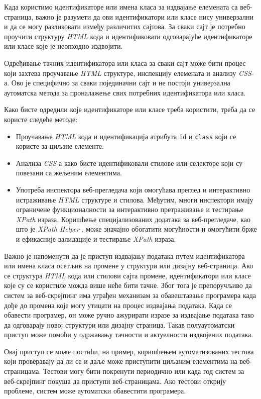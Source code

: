 \documentclass[12pt,oneside]{memoir}
\begin{document}
Када користимо идентификаторе или имена класа за издвајање елемената са веб-страница, важно је разумети да ови идентификатори или класе нису универзални и да се могу разликовати између различитих сајтова. За сваки сајт је потребно проучити структуру \textit{HTML} кода и идентификовати одговарајуће идентификаторе или класе које је неопходно издвојити.

Одређивање тачних идентификатора или класа за сваки сајт може бити процес који захтева проучавање \textit{HTML} структуре, инспекцију елемената и анализу \textit{CSS}-а. Ово је специфично за сваки појединачни сајт и не постоји универзална аутоматска метода за проналажење свих потребних идентификатора или класа.

Како бисте одредили које идентификаторе или класе треба користити, треба да се користе следеће методе:
\begin{itemize}
\item Проучавање \textit{HTML} кода и идентификација атрибута \texttt{id} и \texttt{class}  који се користе за циљане елементе.
\item Анализа \textit{CSS}-а како бисте идентификовали стилове или селекторе који су повезани са жељеним елементима.
\item Употреба инспектора веб-прегледача који омогућава преглед и интерактивно истраживање \textit{HTML} структуре и стилова. Међутим, многи инспектори имају ограничене функционалности за интерактивно претраживање и тестирање \textit{XPath} израза. Коришћење специјализованих додатака за веб-прегледаче, као што је \textit{XPath Helper} \cite{xpathHelper}, може значајно обогатити могућности и омогућити брже и ефикасније валидације и тестирање \textit{XPath} израза.
\end{itemize}

Важно је напоменути да је приступ издвајању података путем идентификатора или имена класа осетљив на промене у структури или дизајну веб-страница. Ако се структура \textit{HTML} кода или стилови сајта промене, идентификатори или класе које су се користиле можда више неће бити тачне. Због тога је препоручљиво да систем за веб-скрејпинг има уграђен механизам за обавештавање програмера када дође до промена које могу утицати на процес издвајања података. Када се обавести програмер, он може ручно ажурирати изразе за издвајање података тако да одговарају новој структури или дизајну страница. Такав полуаутоматски приступ може помоћи у одржавању тачности и актуелности издвојених података.

Овај приступ се може постићи, на пример, коришћењем аутоматизованих тестова који проверавају да ли се и даље може приступити циљаним елементима на веб-страницама. Тестови могу бити покренути периодично или када год систем за веб-скрејпинг покуша да приступи веб-страницама. Ако тестови открију проблеме, систем може аутоматски обавестити програмера.
\end{document}
